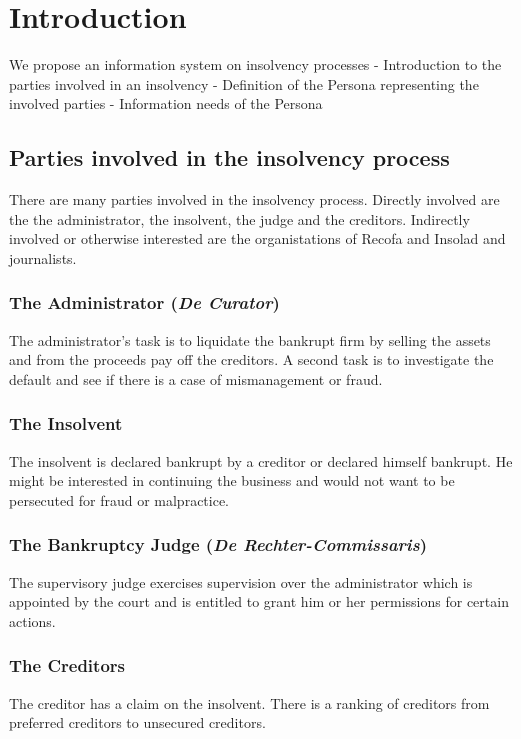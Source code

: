 \section{Introduction}
We propose an information system on insolvency processes
- Introduction to the parties involved in an insolvency
- Definition of the Persona representing the involved parties
- Information needs of the Persona

\subsection{Parties involved in the insolvency process}
There are many parties involved in the insolvency process. Directly involved are the the administrator, the insolvent, the judge and the creditors. Indirectly involved or otherwise interested are the organistations of Recofa and Insolad and journalists. 

\subsubsection{The Administrator (\textit{De Curator})}
The administrator's task is to liquidate the bankrupt firm by selling the assets and from the proceeds pay off the creditors. A second task is to investigate the default and see if there is a case of mismanagement or fraud.

\subsubsection{The Insolvent}
The insolvent is declared bankrupt by a creditor or declared himself bankrupt. He might be interested in continuing the business and would not want to be persecuted for fraud or malpractice.

\subsubsection{The Bankruptcy Judge (\textit{De Rechter-Commissaris})}
The supervisory judge exercises supervision over the administrator which is appointed by the court and is entitled to grant him or her permissions for certain actions.

\subsubsection{The Creditors}
The creditor has a claim on the insolvent. There is a ranking of creditors from preferred creditors to unsecured creditors.


